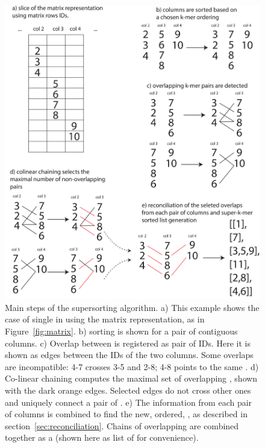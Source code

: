 \begin{figure}[h!]
	\centering
	\includegraphics[width=\textwidth]{figures/kmer_methods/sk_alg_export.pdf}
	\caption[Main steps of the super\kmer sorting algorithm.]{Main steps of the super\kmer sorting algorithm. a) This example shows the case of single \kmers in \skmers using the matrix representation, as in Figure~\ref{fig:matrix}. b) sorting is shown for a pair of contiguous columns. c) Overlap between \kmers is registered as pair of \skmer IDs. Here it is shown as edges between the \skmer IDs of the two columns. Some overlaps are incompatible: 4-7 crosses 3-5 and 2-8; 4-8 points to the same \kmer. d) Co-linear chaining computes the maximal set of overlapping \kmer, shown with the dark orange edges. Selected edges do not cross other ones and uniquely connect a pair of \kmers. e) The information from each pair of columns is combined to find the new, ordered, \skmers, as described in section~\ref{sec:reconciliation}. Chains of overlapping \kmers are combined together as a \skmer (shown here as list of \kmers for convenience).}
	\label{fig:chain}
\end{figure}

